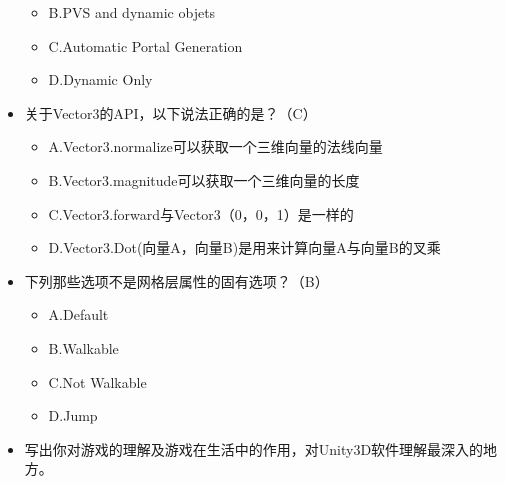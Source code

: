 \documentclass[9pt, b5paper]{article}
\begin{document}
\begin{itemize}
\begin{itemize}
\item B.PVS and dynamic objets
\item C.Automatic Portal Generation
\item D.Dynamic Only
\end{itemize}
\item 关于Vector3的API，以下说法正确的是？（C）
\begin{itemize}
\item A.Vector3.normalize可以获取一个三维向量的法线向量
\item B.Vector3.magnitude可以获取一个三维向量的长度
\item C.Vector3.forward与Vector3（0，0，1）是一样的
\item D.Vector3.Dot(向量A，向量B)是用来计算向量A与向量B的叉乘
\end{itemize}
\item 下列那些选项不是网格层属性的固有选项？（B）
\begin{itemize}
\item A.Default
\item B.Walkable
\item C.Not Walkable
\item D.Jump
\end{itemize}
\item 写出你对游戏的理解及游戏在生活中的作用，对Unity3D软件理解最深入的地方。
\end{itemize}
\end{document}

